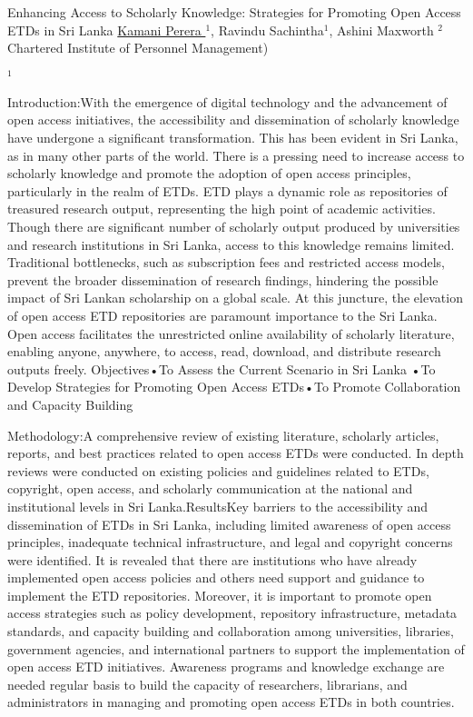 
    \begin{abstract_online}{Enhancing Access to Scholarly Knowledge: Strategies for Promoting Open Access ETDs in Sri Lanka }{%
        \underline{Kamani Perera }$^{1}$, Ravindu Sachintha$^{1}$,  Ashini Maxworth $^{2}$}{%
        Chartered Institute of Personnel Management) }{%
        $^1$ 
       
       Introduction:With the emergence of digital technology and the advancement of open access initiatives, the accessibility and dissemination of scholarly knowledge have undergone a significant transformation. This has been evident in Sri Lanka, as in many other parts of the world. There is a pressing need to increase access to scholarly knowledge and promote the adoption of open access principles, particularly in the realm of ETDs. ETD plays a dynamic role as repositories of treasured research output, representing the high point of academic activities. Though there are significant number of scholarly output produced by universities and research institutions in Sri Lanka, access to this knowledge remains limited. Traditional bottlenecks, such as subscription fees and restricted access models, prevent the broader dissemination of research findings, hindering the possible impact of Sri Lankan scholarship on a global scale. At this juncture, the elevation of open access ETD repositories are paramount importance to the Sri Lanka. Open access facilitates the unrestricted online availability of scholarly literature, enabling anyone, anywhere, to access, read, download, and distribute research outputs freely. Objectives•To Assess the Current Scenario in Sri Lanka •To Develop Strategies for Promoting Open Access ETDs•To Promote Collaboration and Capacity Building
       
       Methodology:A comprehensive review of existing literature, scholarly articles, reports, and best practices related to open access ETDs were conducted. In depth reviews were conducted on existing policies and guidelines related to ETDs, copyright, open access, and scholarly communication at the national and institutional levels in Sri Lanka.ResultsKey barriers to the accessibility and dissemination of ETDs in Sri Lanka, including limited awareness of open access principles, inadequate technical infrastructure, and legal and copyright concerns were identified. It is revealed that there are institutions who have already implemented open access policies and others need support and guidance to implement the ETD repositories. Moreover, it is important to promote open access strategies such as policy development, repository infrastructure, metadata standards, and capacity building and collaboration among universities, libraries, government agencies, and international partners to support the implementation of open access ETD initiatives. Awareness programs and knowledge exchange are needed regular basis to build the capacity of researchers, librarians, and administrators in managing and promoting open access ETDs in both countries.
      
}
\end{abstract_online}
